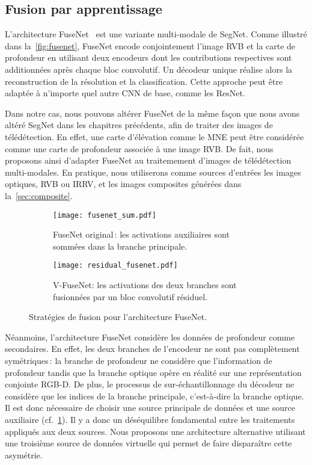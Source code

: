 \subsection{Fusion par apprentissage}

L'architecture FuseNet~\cite{hazirbas_fusenet_2016} est une variante multi-modale de SegNet. Comme illustré dans la~\cref{fig:fusenet}, FuseNet encode conjointement l'image \gls{RVB} et la carte de profondeur en utilisant deux encodeurs dont les contributions respectives sont additionnées après chaque bloc convolutif. Un décodeur unique réalise alors la reconstruction de la résolution et la classification. Cette approche peut être adaptée à n'importe quel autre \gls{CNN} de base, comme les ResNet.

Dans notre cas, nous pouvons altérer FuseNet de la même façon que nous avons altéré SegNet dans les chapitres précédents, afin de traiter des images de télédétection. En effet, une carte d'élévation comme le \gls{MNE} peut être considérée comme une carte de profondeur associée à une image \gls{RVB}. De fait, nous proposons ainsi d'adapter FuseNet au traitemement d'images de télédétection multi-modales. En pratique, nous utiliserons comme sources d'entrées les images optiques, \gls{RVB} ou \gls{IRRV}, et les images composites générées dans la~\cref{sec:composite}.

\begin{figure}[h]
	\begin{subfigure}{0.48\textwidth}
    	\texttt{[image: fusenet\_sum.pdf]}
        \caption{FuseNet original\,: les activations auxiliaires sont sommées dans la branche principale.}
        \label{fig:fusenet_sum}
    \end{subfigure}
    \hfill
    \begin{subfigure}{0.48\textwidth}
    	\texttt{[image: residual\_fusenet.pdf]}
        \caption{V-FuseNet: les activations des deux branches sont fusionnées par un bloc convolutif résiduel.}
        \label{fig:fusenet_mix}
    \end{subfigure}
    \caption{Stratégies de fusion pour l'architecture FuseNet.}
\end{figure}

Néanmoins, l'architecture FuseNet considère les données de profondeur comme secondaires. En effet, les deux branches de l'encodeur ne sont pas complètement symétriques\,: la branche de profondeur ne considère que l'information de profondeur tandis que la branche optique opère en réalité sur une représentation conjointe \gls{RGB-D}. De plus, le processus de sur-échantillonnage du décodeur ne considère que les indices de la branche principale, c'est-à-dire la branche optique. Il est donc nécessaire de choisir une source principale de données et une source auxiliaire (cf.~\cref{fig:fusenet_sum}). Il y a donc un déséquilibre fondamental entre les traitements appliqués aux deux sources. Nous proposons une architecture alternative utilisant une troisième source de données virtuelle qui permet de faire disparaître cette asymétrie.

